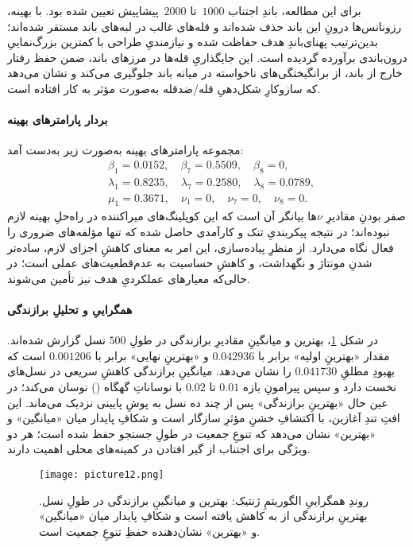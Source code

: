 برای این مطالعه، باندِ اجتناب \(1000\)\, تا \(2000\)\, پیشاپیش تعیین شده بود. با  بهینه، رزونانس‌ها درونِ این باند حذف شده‌اند و قله‌های غالب در لبه‌های باند مستقر شده‌اند؛ بدین‌ترتیب پهنای‌باندِ هدف حفاظت شده و نیازمندیِ طراحی با کمترین بزرگ‌نماییِ درون‌باندی برآورده گردیده است. این جایگذاریِ قله‌ها در مرزهای باند، ضمن حفظ رفتار خارج از باند، از برانگیختگی‌های ناخواسته در میانه باند جلوگیری می‌کند و نشان می‌دهد که سازوکارِ شکل‌دهیِ قله/ضدقله به‌صورت مؤثر به کار افتاده است.

\paragraph{بردار پارامترهای بهینه}
مجموعه پارامترهای بهینه  به‌صورت زیر به‌دست آمد:
\[
\begin{aligned}
&\beta_1 = 0.0152,\quad \beta_7 = 0.5509,\quad \beta_8 = 0,\\
&\lambda_1 = 0.8235,\quad \lambda_7 = 0.2580,\quad \lambda_8 = 0.0789,\\
&\mu_1 = 0.3671,\quad \nu_1 = 0,\quad \nu_7 = 0,\quad \nu_8 = 0.
\end{aligned}
\]
صفر بودنِ مقادیرِ \(\nu\)‌ها بیانگر آن است که این کوپلینگ‌های میراکننده در راه‌حلِ بهینه لازم نبوده‌اند؛ در نتیجه پیکربندیِ تنک و کارآمدی حاصل شده که تنها مؤلفه‌های ضروری را فعال نگاه می‌دارد. از منظرِ پیاده‌سازی، این امر به معنای کاهشِ اجزای لازم، ساده‌تر شدنِ مونتاژ و نگهداشت، و کاهشِ حساسیت به عدم‌قطعیت‌های عملی است؛ در حالی‌که معیارهای عملکردیِ هدف نیز تأمین می‌شوند.

\paragraph{همگراییِ  و تحلیلِ برازندگی}
در شکل \ref{fig:ga_convergence}، بهترین و میانگینِ مقادیرِ برازندگی در طولِ \(500\) نسل گزارش شده‌اند. مقدار «بهترینِ اولیه» برابر با \(0.042936\) و «بهترینِ نهایی» برابر با \(0.001206\) است که بهبودِ مطلقِ \(0.041730\) را نشان می‌دهد. میانگینِ برازندگی کاهشِ سریعی در نسل‌های نخست دارد و سپس پیرامونِ بازه \(0.01\) تا \(0.02\) با نوساناتِ گهگاه () نوسان می‌کند؛ در عین حال «بهترینِ برازندگی» پس از چند ده نسل به پوشِ پایینی نزدیک می‌ماند. این افتِ تندِ آغازین، با اکتشافِ خشنِ مؤثرِ  سازگار است و شکافِ پایدار میان «میانگین» و «بهترین» نشان می‌دهد که تنوعِ جمعیت در طولِ جستجو حفظ شده است؛ هر دو ویژگی برای اجتناب از گیر افتادن در کمینه‌های محلی اهمیت دارند.

\begin{figure}[htbp]
  \centering
  \texttt{[image: picture12.png]}%
  \caption{روندِ همگراییِ الگوریتمِ ژنتیک: بهترین و میانگینِ برازندگی در طولِ  نسل. بهترینِ برازندگی از  به  کاهش یافته است و شکافِ پایدار میان «میانگین» و «بهترین» نشان‌دهنده حفظِ تنوعِ جمعیت است.}
  \label{fig:ga_convergence}
\end{figure}

